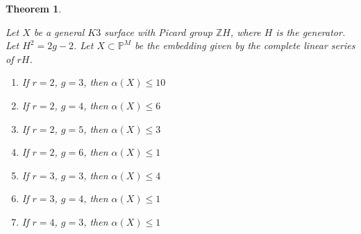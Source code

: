 \documentclass[11pt,twoside]{amsart}
\theoremstyle{plain}
\numberwithin{equation}{section}
\newtheorem{theorem}{Theorem}[section]
\theoremstyle{definition}
\begin{document}
\begin{theorem}\label{ZL for lower genus $K3$ surfaces}

Let $X$ be a general $K3$ surface with Picard group $\mathbb{Z}H$, where $H$ is the generator. Let $H^2 = 2g-2$. Let $X \subset \mathbb{P}^M$ be the embedding given by the complete linear series of $rH$. 
    \begin{enumerate}
        \item \label{2,3} If $r = 2$, $g = 3$, then $\alpha(X) \leq 10$ %
        \item \label{2,4} If $r = 2$, $g = 4$, then $\alpha(X) \leq 6$ 
        \item \label{2,5} If $r = 2$, $g = 5$, then $\alpha(X) \leq 3$ 
        \item \label{2,6} If $r = 2$, $g = 6$, then $\alpha(X) \leq 1$ 
        \item \label{3,3} If $r = 3$, $g = 3$, then $\alpha(X) \leq 4$
        \item \label{3,4} If $r = 3$, $g = 4$, then $\alpha(X) \leq 1$ 
        \item \label{4,3} If $r = 4$, $g = 3$, then $\alpha(X) \leq 1$
        
       
        
    \end{enumerate}
    
\end{theorem}
\end{document}
